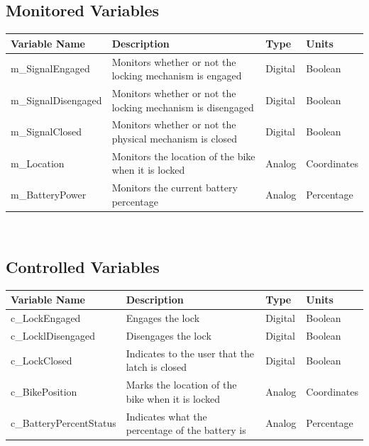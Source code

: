 \documentclass[12pt, titlepage]{article}
\begin{document}

\subsection{Monitored Variables}

\begin{minipage}{\textwidth}
\renewcommand*{\arraystretch}{1.5}
\begin{tabular}{| p{} | p{} | p{} | p{} |}
 \hline
 Variable Name & Description & Type & Units \\ 
 \hline
 m\_SignalEngaged & Monitors whether or not the locking mechanism is engaged & Digital & Boolean \\ 
  \hline
 m\_SignalDisengaged & Monitors whether or not the locking mechanism is disengaged & Digital & Boolean \\ 
  \hline
 m\_SignalClosed& Monitors whether or not the physical mechanism is closed & Digital & Boolean \\ 
  \hline
 m\_Location & Monitors the location of the bike when it is locked & Analog & Coordinates \\ 
  \hline
 m\_BatteryPower & Monitors the current battery percentage & Analog & Percentage \\ 
 \hline
\end{tabular}
\end{minipage}\\

\subsection{Controlled Variables}

\begin{minipage}{\textwidth}
\renewcommand*{\arraystretch}{1.5}
\begin{tabular}{| p{} | p{} | p{} | p{} |}
 \hline
 Variable Name & Description & Type & Units \\ 
 \hline
 c\_LockEngaged & Engages the lock & Digital & Boolean \\ 
  \hline
 c\_LocklDisengaged & Disengages the lock & Digital & Boolean \\ 
  \hline
 c\_LockClosed& Indicates to the user that the latch is closed & Digital & Boolean \\ 
  \hline
 c\_BikePosition & Marks the location of the bike when it is locked & Analog & Coordinates \\ 
  \hline
 c\_BatteryPercentStatus & Indicates what the percentage of the battery is & Analog & Percentage \\ 
 \hline
\end{tabular}
\end{minipage}\\
\end{document}
